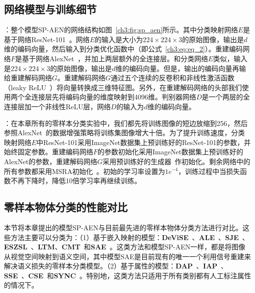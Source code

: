 \subsection{网络模型与训练细节}
\textbf{}：整个模型SP-AEN的网络结构如图~\ref{ch3:fig:sp_aen}所示。其中分类映射网络$E$是基于网络ResNet-101~\cite{he2016deep}。网络$E$的输入是大小为$224\times224\times3$的原始图像，输出是$d$维的编码向量，然后输入到分类优化函数中（即公式~\eqref{ch3:eq:eq_2}）。重建编码网络$F$是基于网络AlexNet~\cite{krizhevsky2012imagenet}，并加上两层额外的全连接层。和分类网络$E$类似，输入是$224\times224\times3$的原始图像，输出是$d$维的编码向量。但是，输出的编码向量再输给重建解码网络$G$。重建解码网络$G$通过五个连续的反卷积和非线性激活函数（leaky ReLU~\cite{he2015delving}）将向量转换成三维特征图。另外，在重建解码网络的头部我们使用两个全连接层先将编码向量的维度映射到4096维。判别器网络$D$是一个两层的全连接层加一个非线性ReLU层，网络$D$的输入为$d$维的编码向量。

\textbf{}：在本章所有的零样本分类实验中，我们都先将训练图像的短边放缩到256，然后参照AlexNet~\cite{krizhevsky2012imagenet}的数据增强策略将训练集图像增大十倍。为了提升训练速度，分类映射网络$E$中ResNet-101采用ImageNet数据集上预训练好的ResNet-101的参数，并始终固定参数。重建编码网络$F$的参数初始化采用ImageNet数据集上预训练好的AlexNet的参数，重建解码网络$G$采用预训练好的生成器~\cite{dosovitskiy2016generating}作初始化。剩余网络中的所有参数都采用MSRA初始化~\cite{he2015delving}。初始的学习率设置为$1e^{-4}$，训练过程中当损失函数不再下降时，降低10倍学习率再继续训练。


\subsection{零样本物体分类的性能对比}
本节将本章提出的模型SP-AEN与目前最先进的零样本物体分类方法进行对比。这些方法主要可以分类为：（1）基于嵌入映射的模型：\textbf{DeViSE}~\cite{frome2013devise}、\textbf{ALE}~\cite{akata2015label}、\textbf{SJE}~\cite{akata2015evaluation}、\textbf{ESZSL}~\cite{romera2015embarrassingly}、\textbf{LTM}\cite{xian2016latent}、\textbf{CMT}~\cite{socher2013zero}和\textbf{SAE}~\cite{kodirov2017semantic}。这类方法和模型SP-AEN一样，都是将图像从视觉空间映射到语义空间，其中模型SAE是目前现有的唯一一个利用信号重建来解决语义损失的零样本分类模型。（2）基于属性的模型：\textbf{DAP}~\cite{lampert2009learning}、\textbf{IAP}~\cite{lampert2009learning}、\textbf{SSE}~\cite{zhang2015zero}、\textbf{CSE}~\cite{norouzi2014zero}和\textbf{SYNC}~\cite{changpinyo2016synthesized}。特别地，这类方法只适用于所有类别都有人工标注属性的情况下。

